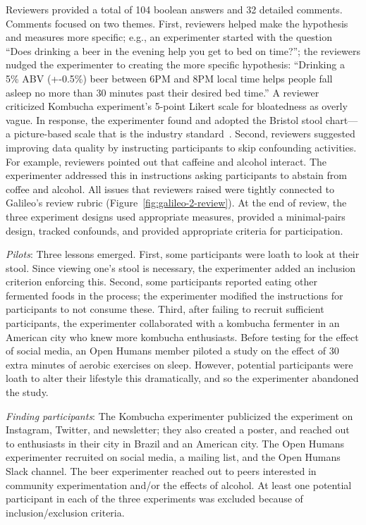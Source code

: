 Reviewers provided a total of 104 boolean answers and 32 detailed comments. Comments focused on two themes. First, reviewers helped make the hypothesis and measures more specific; e.g., an experimenter started with the question “Does drinking a beer in the evening help you get to bed on time?”; the reviewers nudged the experimenter to creating the more specific hypothesis: “Drinking a 5\% ABV (+-0.5\%) beer between 6PM and 8PM local time helps people fall asleep no more than 30 minutes past their desired bed time.” A reviewer criticized Kombucha experiment's 5-point Likert scale for bloatedness as overly vague. In response, the experimenter found and adopted the Bristol stool chart---a picture-based scale that is the industry standard~\cite{Wikipedia2018}. Second, reviewers suggested improving data quality by instructing participants to skip confounding activities. For example, reviewers pointed out that caffeine and alcohol interact. The experimenter addressed this in instructions asking participants to abstain from coffee and alcohol. All issues that reviewers raised were tightly connected to Galileo's review rubric (Figure~\ref{fig:galileo-2-review}). At the end of review, the three experiment designs used appropriate measures, provided a minimal-pairs design, tracked confounds, and provided appropriate criteria for participation.

\textit{Pilots}: Three lessons emerged. First, some participants were loath to look at their stool. Since viewing one's stool is necessary, the experimenter added an inclusion criterion enforcing this. Second, some participants reported eating other fermented foods in the process; the experimenter modified the instructions for participants to not consume these. Third, after failing to recruit sufficient participants, the experimenter collaborated with a kombucha fermenter in an American city who knew more kombucha enthusiasts. Before testing for the effect of social media, an Open Humans member piloted a study on the effect of 30 extra minutes of aerobic exercises on sleep. However, potential participants were loath to alter their lifestyle this dramatically, and so the experimenter abandoned the study.
 
\textit{Finding participants}: The Kombucha experimenter publicized the experiment on Instagram, Twitter, and newsletter; they also created a poster, and reached out to enthusiasts in their city in Brazil and an American city. The Open Humans experimenter recruited on social media, a mailing list, and the Open Humans Slack channel. The beer experimenter reached out to peers interested in community experimentation and/or the effects of alcohol. At least one potential participant in each of the three experiments was excluded because of inclusion/exclusion criteria. 

